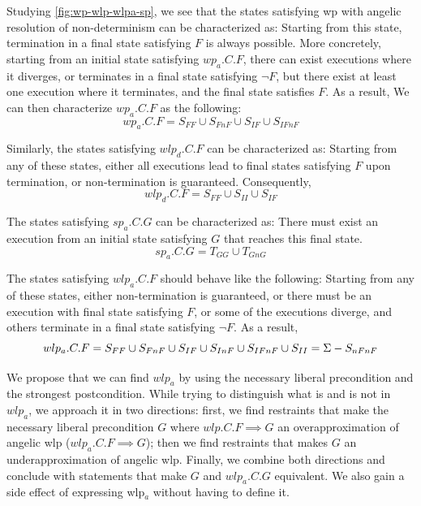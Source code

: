 Studying \autoref{fig:wp-wlp-wlpa-sp}, we see that the states satisfying wp with angelic resolution of non-determinism can be characterized as: 
Starting from this state, termination in a final state satisfying $F$ is always possible. 
More concretely, starting from an initial state satisfying $wp_a.C.F$, there can exist executions where it diverges, or terminates in a final state satisfying $\neg F$, but there  exist at least one execution where it terminates, and the final state satisfies $F$. 
As a result, We can then characterize $wp_a.C.F$ as the following: 
\[wp_a.C.F = S_{FF}\cup S_{FnF}\cup S_{IF}\cup S_{IFnF}\]

Similarly, the states satisfying $wlp_d.C.F$ can be characterized as: 
Starting from any of these states, either all executions lead to final states satisfying $F$ upon termination, or non-termination is guaranteed. 
Consequently, 
\[wlp_d.C.F = S_{FF}\cup S_{II}\cup S_{IF}\]

The states satisfying $sp_a.C.G$ can be characterized as: 
There must exist an execution from an initial state satisfying $G$ that reaches this final state. 
\[sp_a.C.G = T_{GG}\cup T_{GnG}\]

The states satisfying $wlp_a.C.F$ should behave like the following: 
Starting from any of these states, either non-termination is guaranteed, or there must be an execution with final state satisfying $F$, or some of the executions diverge, and others terminate in a final state satisfying $\neg F$. 
As a result, 
\[wlp_a.C.F = S_{FF}\cup S_{FnF}\cup S_{IF}\cup S_{InF}\cup S_{IFnF}\cup S_{II} =\S-S_{nFnF}\]


We propose that we can find $wlp_a$ by using the necessary liberal precondition and the strongest postcondition. 
While trying to distinguish what is and is not in $wlp_a$, we approach it in two directions: first, we find restraints that make the necessary liberal precondition $G$ where $wlp.C.F\implies G$ an overapproximation of angelic wlp ($ wlp_a.C.F \implies G$); then we find restraints that makes $G$ an underapproximation of angelic wlp. 
Finally, we combine both directions and conclude with statements that make $G$ and $wlp_a.C.G$ equivalent. 
We also gain a side effect of expressing wlp$_a$ without having to define it. 

